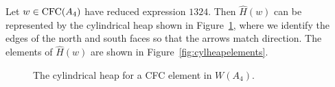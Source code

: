 \begin{example} Let $w \in \operatorname{\mathrm{CFC}}(A_4)$ have reduced expression $1324$. Then $\hat{H}(w)$ can be represented by the cylindrical heap shown in Figure~\ref{fig:cylheap1324}, where we identify the edges of the north and south faces so that the arrows match direction.
    The elements of $\hat{H}(w)$ are shown in Figure~\ref{fig:cylheapelements}.

\begin{center} \begin{figure}[H] \centering
{}
\caption{The cylindrical heap for a CFC element in $W(A_4)$.}\label{fig:cylheap1324}
\end{figure} \end{center}


\end{example}
